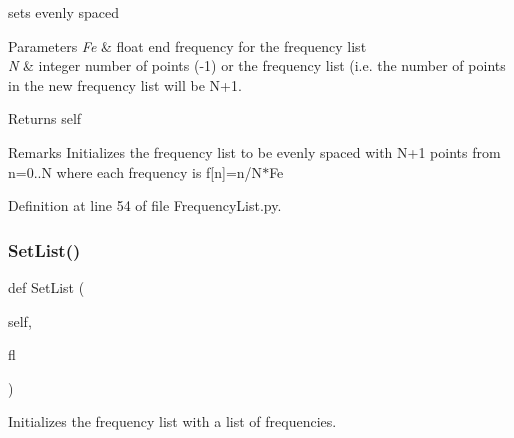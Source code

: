 sets evenly spaced 


\begin{DoxyParams}{Parameters}
{\em Fe} & float end frequency for the frequency list \\
\hline
{\em N} & integer number of points (-\/1) or the frequency list (i.\+e. the number of points in the new frequency list will be N+1. \\
\hline
\end{DoxyParams}
\begin{DoxyReturn}{Returns}
self 
\end{DoxyReturn}
\begin{DoxyRemark}{Remarks}
Initializes the frequency list to be evenly spaced with N+1 points from n=0..N where each frequency is f\mbox{[}n\mbox{]}=n/\+N$\ast$\+Fe 
\end{DoxyRemark}


Definition at line 54 of file Frequency\+List.\+py.

\mbox{\label{classSignalIntegrity_1_1FrequencyDomain_1_1FrequencyList_1_1FrequencyList_a23f5bda3ad522bcdc1af831f4178ddca}} 
\subsubsection{\texorpdfstring{Set\+List()}{SetList()}}
{\footnotesize\ttfamily def Set\+List (\begin{DoxyParamCaption}\item[{}]{self,  }\item[{}]{fl }\end{DoxyParamCaption})}



Initializes the frequency list with a list of frequencies. 


